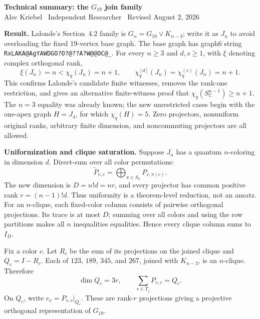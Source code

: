 \documentclass[10pt]{article}
\begin{document}
\begin{center}
{\Large\bfseries Technical summary: the $G_{19}$ join family}\\[-1pt]
{\small Alec Kriebel \textbullet\ Independent Researcher \textbullet\ Revised August 2, 2026}
\end{center}
\vspace{-6pt}
\fontsize{10.1}{11.9}\selectfont

\textbf{Result.}
Lalonde's Section~4.2 family is $G_n=G_{19}\vee K_{n-3}$; write it as $J_n$
to avoid overloading the fixed 19-vertex base graph.  The base graph has
graph6 string \texttt{RxLAKA@AgYAWDGO?O?@??A?W@@OC@\_}.  For every
$n\ge3$ and $d,s\ge1$, with $\xi$ denoting complex orthogonal rank,
\[
 \boxed{\xi(J_n)=n<\chi_q(J_n)=n+1,}\qquad
 \chi_q^{[d]}(J_n)=\chi_q^{(s)}(J_n)=n+1.
\]
This confirms Lalonde's candidate finite witnesses, removes the rank-one
restriction, and gives an alternative finite-witness proof that
$\chi_q(S_{\mathbb C}^{n-1})\ge n+1$.  The $n=3$ equality was already known;
the new unrestricted cases begin with the one-apex graph $H=J_4$, for which
$\chi_q(H)=5$.  Zero projectors,
nonuniform original ranks, arbitrary finite dimension, and noncommuting
projectors are all allowed.

\textbf{Uniformization and clique saturation.}
Suppose $J_n$ has a quantum $n$-coloring in dimension $d$.  Direct-sum over
all color permutations:
\[
 \widetilde P_{v,c}=\bigoplus_{\pi\in S_n}P_{v,\pi(c)}.
\]
The new dimension is $D=n!d=nr$, and every projector has common positive
rank $r=(n-1)!d$.  Thus uniformity is a theorem-level reduction, not an
ansatz.  For an $n$-clique, each fixed-color column consists of pairwise
orthogonal projections.  Its trace is at most $D$; summing over all colors
and using the row partitions makes all $n$ inequalities equalities.  Hence
every clique column sums to $I_D$.

Fix a color $c$.  Let $R_c$ be the sum of its projections on the joined
clique and $Q_c=I-R_c$.  Each of $123$, $189$, $345$, and $267$, joined with
$K_{n-3}$, is an $n$-clique.  Therefore
\[
 \dim Q_c=3r,\qquad \sum_{v\in T_j}P_{v,c}=Q_c.
\]
On $Q_c$, write $e_v=P_{v,c}|_{Q_c}$.  These are rank-$r$ projections giving
a projective orthogonal representation of $G_{19}$.
\end{document}
